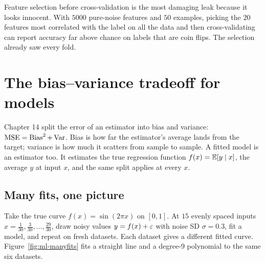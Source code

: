 \begin{trapbox}
Feature selection before cross-validation is the most damaging leak because it looks
innocent. With $5000$ pure-noise features and $50$ examples, picking the $20$ features most
correlated with the label on all the data and then cross-validating can report accuracy far
above chance on labels that are coin flips. The selection already saw every fold.
\end{trapbox}

\section{The bias--variance tradeoff for models}
\label{sec:ml-biasvar}

Chapter 14 split the error of an estimator into bias and variance:
$\operatorname{MSE} = \operatorname{Bias}^2 + \operatorname{Var}$. Bias is how far the estimator's average lands from the target;
variance is how much it scatters from sample to sample. A fitted model is an estimator too.
It estimates the true regression function $f(x)=\operatorname{\mathbb{E}}[y\mid x]$, the average $y$ at input $x$,
and the same split applies at every $x$.

\subsection{Many fits, one picture}

Take the true curve $f(x)=\sin(2\pi x)$ on $[0,1]$. At $15$ evenly spaced inputs
$x=\tfrac1{30},\tfrac3{30},\dots,\tfrac{29}{30}$, draw noisy values $y=f(x)+\varepsilon$ with noise
SD $\sigma=0.3$, fit a model, and repeat on fresh datasets. Each dataset gives a different
fitted curve. Figure~\ref{fig:ml-manyfits} fits a straight line and a degree-9 polynomial to
the same six datasets.

